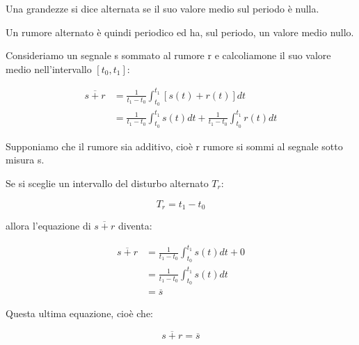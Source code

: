 Una grandezze si dice alternata se il suo valore medio sul periodo è nulla. \newline 

Un rumore alternato è quindi periodico ed ha, sul periodo, un valore medio nullo. \newline 

Consideriamo un segnale s sommato al rumore r e calcoliamone il suo valore medio nell'intervallo $[t_0, t_1]$: 

{
    \Large
    \begin{equation}
        \begin{split}
        \overline{s + r}
        &= 
        \frac{1}{t_1 - t_0}
        \int_{t_0}^{t_1}
        \left[ 
            s(t) + r(t)
        \right]
        dt
        \\
        &= 
        \frac{1}{t_1 - t_0}
        \int_{t_0}^{t_1}
            s(t)
        dt 
        +
        \frac{1}{t_1 - t_0}
        \int_{t_0}^{t_1}
            r(t)
        dt
        \end{split}
    \end{equation}
}

Supponiamo che il rumore sia additivo, cioè r rumore si sommi al segnale sotto misura s. \newline 

Se si sceglie un intervallo del disturbo alternato $T_r$: 

{
    \Large 
    \begin{equation}
        T_r = t_1 - t_0
    \end{equation}
} 

allora l'equazione di $\overline{s + r}$ diventa: 

{
    \Large 
    \begin{equation}
        \begin{split}
        \overline{s + r}
        &= 
        \frac{1}{t_1 - t_0}
        \int_{t_0}^{t_1}
            s(t)
        dt 
        +
        0
        \\ 
        &= 
        \frac{1}{t_1 - t_0}
        \int_{t_0}^{t_1}
            s(t)
        dt
        \\ 
        &= 
        \overline{s}           
        \end{split}
    \end{equation}
}

Questa ultima equazione, cioè che: 

{
    \Large 
    \begin{equation}
        \overline{s + r}
        = 
        \overline{s}
    \end{equation}
}

